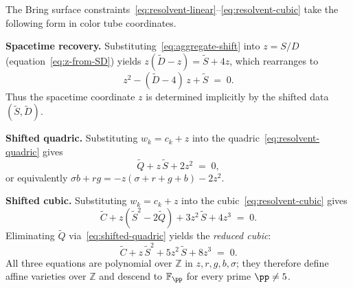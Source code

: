 \begin{remark}
\label{rem:color-tube-constraints}
  The Bring surface constraints~\eqref{eq:resolvent-linear}--\eqref{eq:resolvent-cubic}
  take the following form in color tube coordinates.

  \medskip
  \noindent\textbf{Spacetime recovery.}\;
  Substituting~\eqref{eq:aggregate-shift} into $z = S/D$
  (equation~\eqref{eq:z-from-SD}) yields $z(\widetilde{D} - z) = \widetilde{S} + 4z$,
  which rearranges to
  \begin{equation}\label{eq:spacetime-recovery}
    z^2 - (\widetilde{D} - 4)\,z + \widetilde{S} \;=\; 0.
  \end{equation}
  Thus the spacetime coordinate $z$ is determined implicitly by the
  shifted data $(\widetilde{S}, \widetilde{D})$.

  \medskip
  \noindent\textbf{Shifted quadric.}\;
  Substituting $w_k = c_k + z$ into the quadric~\eqref{eq:resolvent-quadric}
  gives
  \begin{equation}\label{eq:shifted-quadric}
    \widetilde{Q} + z\,\widetilde{S} + 2z^2 \;=\; 0,
  \end{equation}
  or equivalently $\sigma b + rg = -z(\sigma + r + g + b) - 2z^2$.

  \medskip
  \noindent\textbf{Shifted cubic.}\;
  Substituting $w_k = c_k + z$ into the cubic~\eqref{eq:resolvent-cubic}
  gives
  \begin{equation}\label{eq:shifted-cubic}
    \widetilde{C} + z(\widetilde{S}^2 - 2\widetilde{Q})
    + 3z^2\,\widetilde{S} + 4z^3 \;=\; 0.
  \end{equation}
  Eliminating $\widetilde{Q}$ via~\eqref{eq:shifted-quadric} yields the
  \emph{reduced cubic}:
  \begin{equation}\label{eq:reduced-cubic}
    \widetilde{C} + z\,\widetilde{S}^2 + 5z^2\,\widetilde{S} + 8z^3 \;=\; 0.
  \end{equation}
  All three equations are polynomial over $\mathbb{Z}$ in $z, r, g, b, \sigma$;
  they therefore define affine varieties over $\mathbb{Z}$ and descend
  to $\mathbb{F}_\pp$ for every prime $\pp \ne 5$.
\end{remark}


